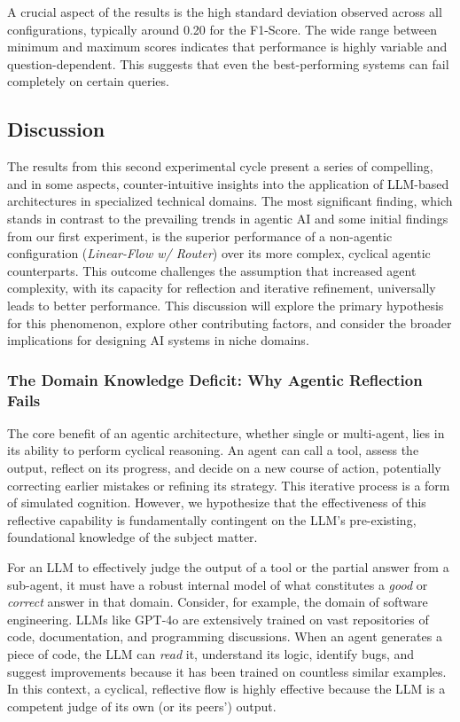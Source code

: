         A crucial aspect of the results is the high standard deviation observed across all configurations, typically around 0.20 for the F1-Score. The wide range between minimum and maximum scores indicates that performance is highly variable and question-dependent. This suggests that even the best-performing systems can fail completely on certain queries.



    \subsection{Discussion} \label{sec:exp2-discussion}

        The results from this second experimental cycle present a series of compelling, and in some aspects, counter-intuitive insights into the application of LLM-based architectures in specialized technical domains. The most significant finding, which stands in contrast to the prevailing trends in agentic AI and some initial findings from our first experiment, is the superior performance of a non-agentic configuration (\textit{Linear-Flow w/ Router}) over its more complex, cyclical agentic counterparts. This outcome challenges the assumption that increased agent complexity, with its capacity for reflection and iterative refinement, universally leads to better performance. This discussion will explore the primary hypothesis for this phenomenon, explore other contributing factors, and consider the broader implications for designing AI systems in niche domains.

        \subsubsection{The Domain Knowledge Deficit: Why Agentic Reflection Fails}

            The core benefit of an agentic architecture, whether single or multi-agent, lies in its ability to perform cyclical reasoning. An agent can call a tool, assess the output, reflect on its progress, and decide on a new course of action, potentially correcting earlier mistakes or refining its strategy. This iterative process is a form of simulated cognition. However, we hypothesize that the effectiveness of this reflective capability is fundamentally contingent on the LLM's pre-existing, foundational knowledge of the subject matter.
            
            For an LLM to effectively judge the output of a tool or the partial answer from a sub-agent, it must have a robust internal model of what constitutes a \textit{good} or \textit{correct} answer in that domain. Consider, for example, the domain of software engineering. LLMs like GPT-4o are extensively trained on vast repositories of code, documentation, and programming discussions. When an agent generates a piece of code, the LLM can \textit{read} it, understand its logic, identify bugs, and suggest improvements because it has been trained on countless similar examples. In this context, a cyclical, reflective flow is highly effective because the LLM is a competent judge of its own (or its peers') output.
            
